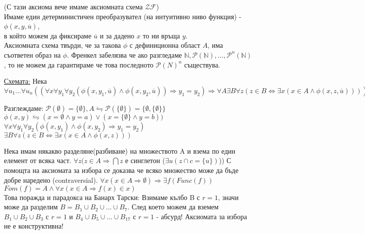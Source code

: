 \documentclass[fleqn, titlepage, 12pt]{report}
\begin{document}
 (С тази аксиома вече имаме аксиомната схема $ \mathcal{ZF} $) \\
Имаме един детерминистичен преобразувател (на интуитивно ниво функция) - $ \phi(x,y,\overline{u})$,\\
в който можем да фиксираме $\overline{u}$ и за дадено $ x $ то ни връща $ y $.\\
Аксиомната схема твърди, че за такова $\phi$ с дефиниционна област $ A $, има съответен образ на $\phi$.
Френкел забелязва че ако разгледаме $ \mathbb{N}, \mathcal{P}( \mathbb{N}), ..., \mathcal{P}^n( \mathbb{N})  $,
то не можем да гарантираме че това последното $ \mathcal{P}(N)^n $ съществува.
\bigbreak

\underline{Схемата:} Нека
$\forall{u_1}... \forall{u_n} ((\forall{x} \forall{y_1} \forall{y_2}  (\phi(x,y_1,\overline{u})\land \phi(
x,y_2,\overline{u}
))
\Rightarrow y_1 = y_2) \Rightarrow \forall{A} \exists{B} \forall{z} (z \in B \Leftrightarrow \exists{x} (
x \in A \land \phi(x,z,\overline{u})
)))$
\bigbreak

Разглеждаме: $ \mathcal{P}(\emptyset) = \{ \emptyset\}, A \leftrightharpoons \mathcal{P}(
\{\emptyset\}
) = \{ \emptyset, \{ \emptyset\}\} $\\
$ \phi(x,y) \leftrightharpoons (x = \emptyset \land y = a) \lor (x = \{ \emptyset\} \land y = b) )$\\
$ \forall{x} \forall{y_1} \forall{y_2} ( \phi(x,y_1) \land \phi(x,y_2) \Rightarrow  y_1 = y_2)$\\
$ \exists{B} \forall{z} (z \in B \Leftrightarrow \exists{x} (x \in A \land \phi(x,z)))$\\
\bigbreak

 Нека имам някакво разделяне(разбиване) на множеството A
и взема по един елемент от всяка част.
$ \forall{z} (z \in A \Rightarrow  \bigcap z$ е синглетон ($ \exists{u} (z \cap c = \{ u\})$))
\bigbreak
С помощта на аксиомата за избора се доказва че всяко множество може да бъде добре наредено (contraversial).
$ \forall{x} (x \in A \Rightarrow \emptyset) \Rightarrow \exists{f} (Func(f))$\\
$ Fom(f) = A \land \forall{x} (x \in A \Rightarrow f(x) \in x)$\\
Това поражда и парадокса на Банарх Тарски: Взимаме кълбо B с $r = 1$,
значи може да разделим $B = B_1 \cup B_2 \cup ... \cup B_7$. След което можем да вземем
$B_1 \cup B_2 \cup B_3$ с $r = 1$ и $B_4 \cup B_5 \cup ... \cup B_17$ с $r = 1$ - абсурд!
Аксиомата за избора не е конструктивна!
\bigbreak
\end{document}
